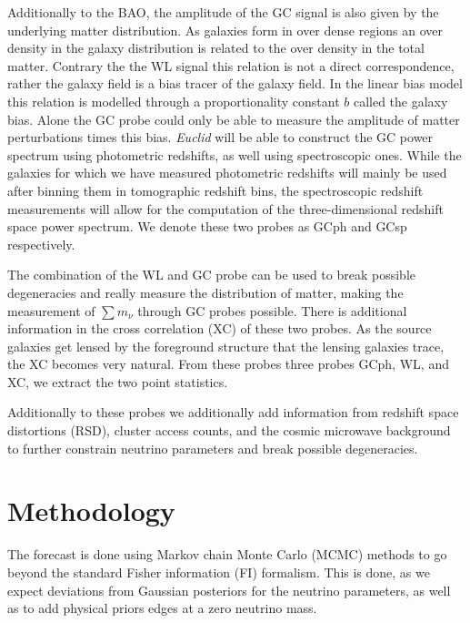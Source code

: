 \documentclass[a4paper,11pt]{article}
\newcommand{\euclid}{\textit{Euclid}\xspace}
\newcommand{\summnu}{\sum m_\nu}
\begin{document}
Additionally to the BAO, the amplitude of the GC signal is also given by the underlying matter distribution. As galaxies form in over dense regions an over density in the galaxy distribution is related to the over density in the total matter. Contrary the the WL signal this relation is not a direct correspondence, rather the galaxy field is a bias tracer of the galaxy field. In the linear bias model this relation is modelled through a proportionality constant $b$ called the galaxy bias. Alone the GC probe could only be able to measure the amplitude of matter perturbations times this bias. \euclid will be able to construct the GC power spectrum using photometric redshifts, as well using spectroscopic ones. While the galaxies for which we have measured photometric redshifts will mainly be used after binning them in tomographic redshift bins, the spectroscopic redshift measurements will allow for the computation of the three-dimensional redshift space power spectrum. We denote these two probes as GCph and GCsp respectively.

The combination of the WL and GC probe can be used to break possible degeneracies and really measure the distribution of matter, making the measurement of $\summnu$ through GC probes possible. There is additional information in the cross correlation (XC) of these two probes. As the source galaxies get lensed by the foreground structure that the lensing galaxies trace, the XC becomes very natural. From these probes three probes GCph, WL, and XC, we extract the two point statistics.

Additionally to these probes we additionally add information from redshift space distortions (RSD), cluster access counts, and the cosmic microwave background to further constrain neutrino parameters and break possible degeneracies.

\section{Methodology}
The forecast is done using Markov chain Monte Carlo (MCMC) methods to go beyond the standard Fisher information (FI) formalism. This is done, as we expect deviations from Gaussian posteriors for the neutrino parameters, as well as to add physical priors edges at a zero neutrino mass.
\end{document}
